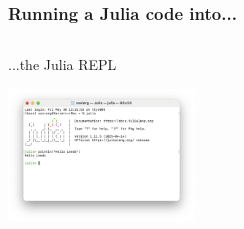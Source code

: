 \documentclass[]{beamer}
\begin{document}
% 
%

\begin{frame}
  \frametitle{Running a Julia code into...}
\vspace{3mm}

%            
%            
%                                    
%            
%            
         
      
    \begin{columns}
      \begin{column}{0.3\textwidth}
      \vspace{0mm}
      ...the Julia REPL
      
       \centerline{\includegraphics[angle=0,origin=c,height=35mm]{replLeeds.png}}      
       
       \vspace{15mm}
      \end{column}
      
      \begin{column}{0.33\textwidth}
      \vspace{5mm}
      

\end{column}
\end{columns}
\end{frame}
\end{document}
